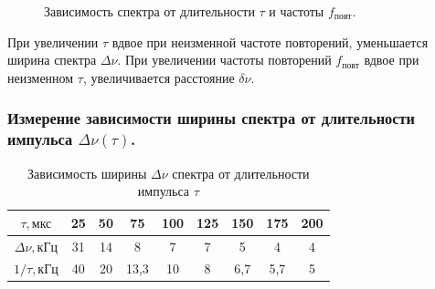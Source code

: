 \documentclass[a4paper, 12pt,twoside]{article}
\begin{document}
\begin{figure}[h]
\begin{minipage}[h]{0.30\linewidth}
	\end{minipage}
	
	\caption{Зависимость спектра от длительности $\tau$ и частоты $f_{\text{повт}}$.}
	\label{ris:image1}
\end{figure}


При увеличении $\tau$ вдвое при неизменной частоте повторений, уменьшается ширина спектра $\Delta \nu $. При увеличении частоты повторений $f_\text{повт}$ вдвое при неизменном $\tau$, увеличивается расстояние $\delta \nu$. 

\subsubsection*{Измерение зависимости ширины спектра от длительности импульса $\Delta\nu(\tau)$.}

\begin{table}[H]
\centering
\caption{Зависимость ширины $\Delta \nu$ спектра  от длительности импульса $\tau$}

\begin{tabular}{|c|c|c|c|c|c|c|c|c|}
\hline
$\tau, \text{мкс}$       & 25   & 50   & 75   & 100   & 125   & 150 & 175 & 200 \\ \hline 
$\Delta \nu, \text{кГц}$ & 31  & 14   & 8   & 7   & 7   & 5 & 4 & 4        \\ \hline
$1/\tau, \text{кГц}$     & 40   & 20   & 13,3 & 10 & 8 & 6,7 & 5,7 &5          \\ \hline
\end{tabular}


\end{table}
\end{document}
